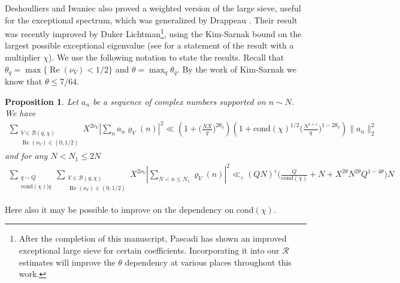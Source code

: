 \documentclass[12pt]{amsart}
\newtheorem{proposition}[theorem]{Proposition}
\theoremstyle{definition}
\theoremstyle{remark}
\numberwithin{equation}{section}
\newcommand{\B}{\mathcal{B}}
\newcommand{\1}{{\mathbf 1}}
\newcommand{\eps}{\varepsilon}
\renewcommand{\Re}{\operatorname{Re}}
\begin{document}
Deshoulliers and Iwaniec \cite{deshoullieriwaniec} also proved a weighted version of the large sieve, useful for the exceptional spectrum, which was generalized by Drappeau \cite{Drappeau}. Their result was recently improved by Duker Lichtman\footnote{After the completion of this manuscript, Pascadi \cite{pascadi2024large} has shown an improved exceptional large sieve for certain coefficients. Incorporating it into our $\mathcal{R}$ estimates will improve the $\theta$ dependency at various places throughout this work.}, using the Kim-Sarnak bound on the largest possible exceptional eigenvalue (see \cite[Remark at the end of Section 4.2]{Drappeau} for a statement of the result with 
a multiplier $\chi$). We use the following notation to state the results. Recall that $\theta_q = \max\{ \Re(\nu_V) < 1/2 \}$  and $\theta=\max_{q} \theta_q$. By the work of Kim-Sarnak \cite{KimSarnak} we know that $\theta \leq 7/64.$


\begin{proposition}\label{prop:exclasie}
Let $a_n$ be a sequence of complex numbers supported on $n\sim N$.    We have
    \begin{align*}
        \sum_{\substack{V\in \B(q,\chi) \\ \Re(\nu_V) \in (0,1/2)}} X^{2 \nu_V} \left|\sum_{n} a_n   \varrho_V(n) \right|^2\ll \left(1+\bigg(\frac{NX}{q}\bigg)^{2\theta_q} \right)\left(1+ \mathrm{cond}(\chi)^{1/2}\bigg(\frac{N^{1+\eps}}{q}\bigg)^{1-2\theta_q} \right)\|  a_n\|_2^2
    \end{align*}
    and for any $N<N_1\leq 2N$
    \begin{align*}
       \sum_{\substack{q\sim Q \\ \mathrm{cond}(\chi) | q}}    \sum_{\substack{V\in \B(q,\chi) \\ \Re(\nu_V) \in (0,1/2)}} X^{2 \nu_V} \left|\sum_{N<n\leq N_1}  \varrho_V(n) \right|^2 \ll_\eps (QN)^\eps  \bigg(\frac{Q} {\mathrm{cond}(\chi)}  + N +  X^{2\theta} N^{2\theta} Q^{1-4\theta}\bigg) N
    \end{align*}
\end{proposition}
Here also it may be possible to improve on the dependency on $\mathrm{cond}(\chi)$.
\end{document}
